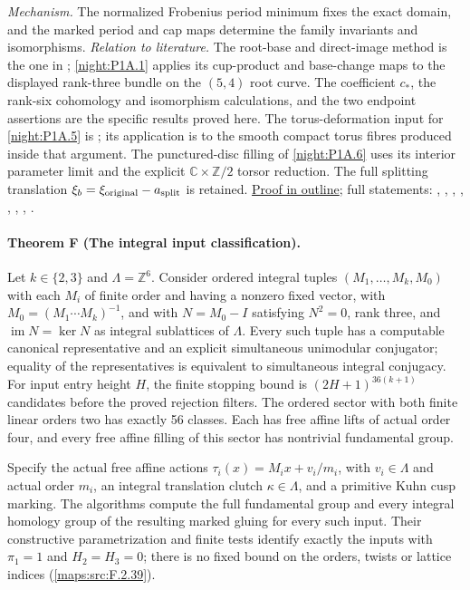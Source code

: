 \textit{Mechanism.} The normalized Frobenius period minimum fixes the exact domain, and the marked period and cap maps determine the family invariants and isomorphisms.
\textit{Relation to literature.}
The root-base and direct-image method is the one in
\cite[Lemmas~6.1--6.2, pp.~74--75, and Proposition~6.10,
pp.~79--80]{DGKX2026v1};
\cref{night:P1A.1} applies its cup-product and base-change
maps to the displayed rank-three bundle on the $(5,4)$ root curve.
The coefficient $c_*$, the rank-six cohomology and
isomorphism calculations, and the two endpoint assertions are
the specific results proved here.  The torus-deformation input
for \cref{night:P1A.5} is \cite[Theorem~2.1, p.~264]{Catanese2004};
its application is to the smooth compact torus fibres produced
inside that argument.  The punctured-disc filling of
\cref{night:P1A.6} uses its interior parameter limit and
the explicit $\mathbb C\times\mathbb Z/2$ torsor reduction.
The full splitting translation
$\xi_b=\xi_{\rm original}-a_{\rm split}$ is retained.
\hyperlink{outline-V-E}{Proof in outline}; full statements: , , , , , , , .

\hypertarget{main-V-F}{}
\paragraph{Theorem F (The integral input classification).}
\label{series:V:F}
Let $k\in\{2,3\}$ and $\Lambda=\mathbb Z^6$.
Consider ordered integral tuples $(M_1,\ldots,M_k,M_0)$ with each
$M_i$ of finite order and having a nonzero fixed vector, with
$M_0=(M_1\cdots M_k)^{-1}$, and with
$N=M_0-I$ satisfying $N^2=0$, rank three, and
$\operatorname{im}N=\ker N$ as integral sublattices of $\Lambda$.
Every such tuple has a computable canonical representative and an
explicit simultaneous unimodular conjugator; equality of the
representatives is equivalent to simultaneous integral conjugacy.
For input entry height $H$, the finite stopping bound is
$(2H+1)^{36(k+1)}$ candidates before the proved rejection filters.
The ordered sector with both finite linear orders two has exactly
56 classes.  Each has free affine lifts of actual order four,
and every free affine filling of this sector has nontrivial
fundamental group.

Specify the actual free affine actions
$\tau_i(x)=M_ix+v_i/m_i$, with $v_i\in\Lambda$ and actual
order $m_i$, an integral translation clutch $\kappa\in\Lambda$,
and a primitive Kuhn cusp marking.  The algorithms compute the
full fundamental group and every integral homology group of the
resulting marked gluing for every such input.  Their constructive
parametrization and finite tests identify exactly the inputs with
$\pi_1=1$ and $H_2=H_3=0$; there is no fixed bound on the
orders, twists or lattice indices (\cref{maps:src:F.2.39}).

